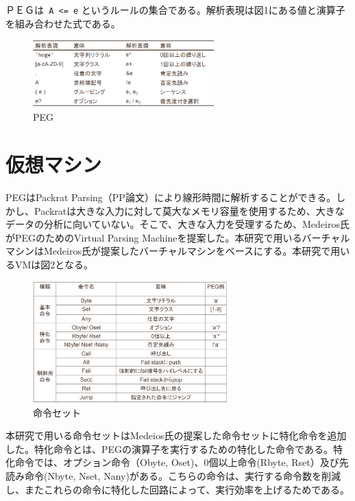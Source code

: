 \documentclass[paper]{ieicej}
\begin{document}
ＰＥＧは\texttt{ A <= e} というルールの集合である。解析表現は図1にある値と演算子を組み合わせた式である。\\



\begin{figure}[h]
    \begin{center}
        \includegraphics[width=70mm]{./fig/PEG}
       \caption{PEG}
    \end{center}
\end{figure}


\section{仮想マシン}

PEGはPackrat Parsing（PP論文）により線形時間に解析することができる。しかし、Packratは大きな入力に対して莫大なメモリ容量を使用するため、大きなデータの分析に向いていない。そこで、大きな入力を受理するため、Medeiros氏がPEGのためのVirtual Parsing Machineを提案した。本研究で用いるバーチャルマシンはMedeiros氏が提案したバーチャルマシンをベースにする。本研究で用いるVMは図2となる。

\begin{figure}[h]
    \begin{center}
        \includegraphics[width=75mm]{./fig/VM1}
       \caption{命令セット}
    \end{center}
\end{figure}

本研究で用いる命令セットはMedeios氏の提案した命令セットに特化命令を追加した。特化命令とは、PEGの演算子を実行するための特化した命令である。特化命令では、オプション命令（Obyte, Oset)、0個以上命令(Rbyte, Rset）及び先読み命令(Nbyte, Nset, Nany)がある。こちらの命令は、実行する命令数を削減し、またこれらの命令に特化した回路によって、実行効率を上げるためである。
\end{document}
